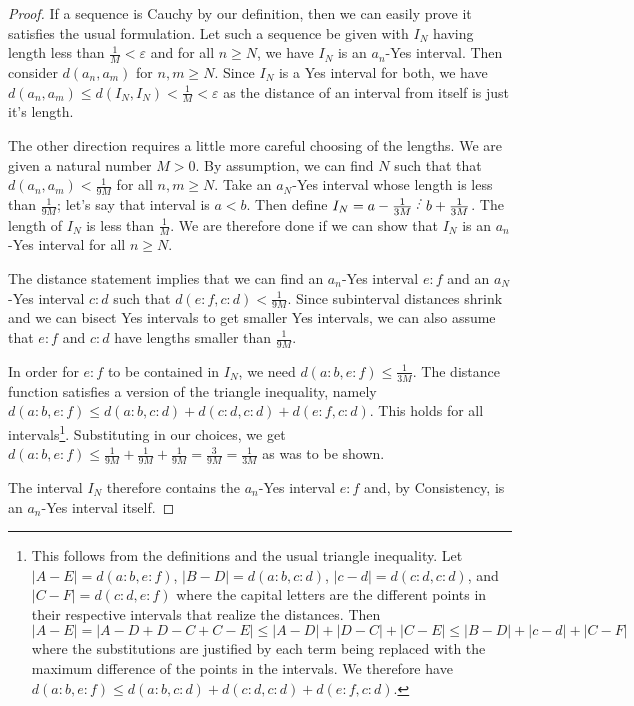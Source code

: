 \documentclass[12pt]{article}
\begin{document}
\begin{proof}
    
If a sequence is Cauchy by our definition, then we can easily prove it satisfies the usual formulation.  Let such a sequence be given with $I_N$ having length less than $\frac{1}{M} < \varepsilon$ and for all $n \geq N$, we have $I_N$ is an $a_n$-Yes interval. Then consider $d(a_n, a_m)$ for $n, m \geq N$. Since $I_N$ is a Yes interval for both, we have $d(a_n, a_m) \leq d(I_N, I_N) < \frac{1}{M} < \varepsilon$ as the distance of an interval from itself is just it's length. 

The other direction requires a little more careful choosing of the lengths. We are given a natural number $M>0$. By assumption, we can find $N$ such that that $d(a_n, a_m) < \frac{1}{9M}$ for all $n, m \geq N$. Take an $a_N$-Yes interval whose length is less than $\frac{1}{9M}$; let's say that interval is $a \lt b$. Then define $I_N = a-\frac{1}{3M} \lte b + \frac{1}{3M}$. The length of $I_N$ is less than $\frac{1}{M}$. We are therefore done if we can show that $I_N$ is an $a_n$-Yes interval for all $n \geq N$.

The distance statement implies that we can find an $a_n$-Yes interval $e:f$ and an $a_N$-Yes interval $c:d$ such that $d(e:f, c:d) < \frac{1}{9M}$. Since subinterval distances shrink and we can bisect Yes intervals to get smaller Yes intervals, we can also assume that $e:f$ and $c:d$ have lengths smaller than $\frac{1}{9M}$. 

In order for $e:f$ to be contained in $I_N$, we need $d(a:b, e:f) \leq \frac{1}{3M}$. The distance function satisfies a version of the triangle inequality, namely $d(a:b, e:f) \leq d(a:b, c:d) + d(c:d, c:d) + d(e:f, c:d)$. This holds for all intervals\footnote{This follows from the definitions and the usual triangle inequality. Let $|A-E| = d(a:b, e:f)$, $|B-D| = d(a:b, c:d)$, $|c-d| = d(c:d, c:d)$, and $|C-F| = d(c:d, e:f)$ where the capital letters are the different points in their respective intervals that realize the distances. Then $|A-E| = |A - D + D - C + C - E| \leq |A-D| + |D-C| + |C-E| \leq |B-D| + |c-d| + |C-F|$ where the substitutions are justified by each term being replaced with the maximum difference of the points in the intervals.  We therefore have $d(a:b, e:f) \leq d(a:b, c:d) + d(c:d, c:d) + d(e:f, c:d)$.}. Substituting in our choices, we get $ d(a:b, e:f)  \leq \frac{1}{9M} + \frac{1}{9M} + \frac{1}{9M} =  \frac{3}{9M} = \frac{1}{3M}$ as was to be shown. 

The interval $I_N$ therefore contains the $a_n$-Yes interval $e:f$ and, by Consistency, is an $a_n$-Yes interval itself. 

\end{proof}
\end{document}
